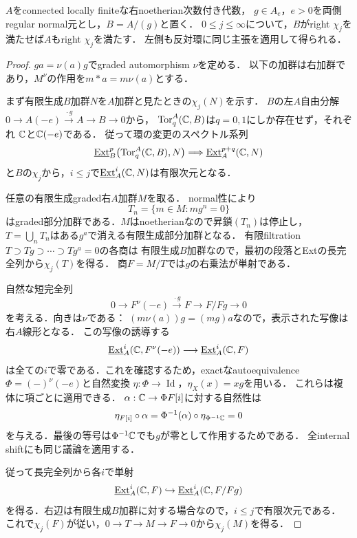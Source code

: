 \documentclass[11pt,a4paper]{ltjsarticle}
\begin{document}
\begin{lemma}
\label{lem:v8-normal-chi-lift}
$A$をconnected locally finiteな右noetherian次数付き代数，
$g\in A_e$，$e>0$を両側regular normal元とし，$B=A/(g)$と置く．
$0\le j\le\infty$について，$B$がright $\chi_j$を満たせば$A$もright $\chi_j$を満たす．
左側も反対環に同じ主張を適用して得られる．
\end{lemma}
\begin{proof}
$ga=\nu(a)g$でgraded automorphism $\nu$を定める．
以下の加群は右加群であり，$M^\nu$の作用を$m*a=m\nu(a)$とする．

まず有限生成$B$加群$N$を$A$加群と見たときの$\chi_j(N)$を示す．
$B$の左$A$自由分解
$0\to A(-e)\xrightarrow{\,\cdot g\,}A\to B\to0$から，
$\operatorname{Tor}_q^A(\mathbb C,B)$は$q=0,1$にしか存在せず，それぞれ
$\mathbb C$と$\mathbb C(-e)$である．
従って環の変更のスペクトル系列
\[
 \underline{\operatorname{Ext}}_B^p\bigl(\operatorname{Tor}_q^A(\mathbb C,B),N\bigr)
 \Longrightarrow
 \underline{\operatorname{Ext}}_A^{p+q}(\mathbb C,N)
\]
と$B$の$\chi_j$から，$i\le j$で$\underline{\operatorname{Ext}}_A^i(\mathbb C,N)$は有限次元となる．

任意の有限生成graded右$A$加群$M$を取る．
normal性により
\[
 T_n=\{m\in M:mg^n=0\}
\]
はgraded部分加群である．$M$はnoetherianなので昇鎖$(T_n)$は停止し，
$T=\bigcup_nT_n$はある$g^a$で消える有限生成部分加群となる．
有限filtration $T\supset Tg\supset\cdots\supset Tg^a=0$の各商は
有限生成$B$加群なので，最初の段落とExtの長完全列から$\chi_j(T)$を得る．
商$F=M/T$では$g$の右乗法が単射である．

自然な短完全列
\[
 0\longrightarrow F^\nu(-e)
 \xrightarrow{\,\cdot g\,}F
 \longrightarrow F/Fg\longrightarrow0
\]
を考える．向きは$\nu$である：
$(m\nu(a))g=(mg)a$なので，表示された写像は右$A$線形となる．
この写像の誘導する
\[
 \underline{\operatorname{Ext}}_A^i(\mathbb C,F^\nu(-e))
 \longrightarrow\underline{\operatorname{Ext}}_A^i(\mathbb C,F)
\]
は全ての$i$で零である．これを確認するため，exactなautoequivalence
$\Phi=(-)^\nu(-e)$と自然変換
$\eta:\Phi\to\operatorname{Id}$，$\eta_X(x)=xg$を用いる．
これらは複体に項ごとに適用できる．
$\alpha:\mathbb C\to\Phi F[i]$に対する自然性は
\[
 \eta_{F[i]}\circ\alpha
 =\Phi^{-1}(\alpha)\circ\eta_{\Phi^{-1}\mathbb C}
 =0
\]
を与える．最後の等号は$\Phi^{-1}\mathbb C$でも$g$が零として作用するためである．
全internal shiftにも同じ議論を適用する．

従って長完全列から各$i$で単射
\[
 \underline{\operatorname{Ext}}_A^i(\mathbb C,F)
 \hookrightarrow\underline{\operatorname{Ext}}_A^i(\mathbb C,F/Fg)
\]
を得る．右辺は有限生成$B$加群に対する場合なので，$i\le j$で有限次元である．
これで$\chi_j(F)$が従い，$0\to T\to M\to F\to0$から$\chi_j(M)$を得る．
\end{proof}
\end{document}
